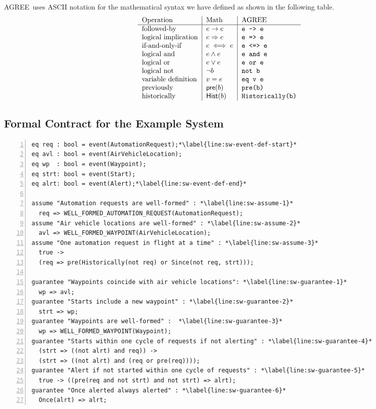\documentclass[global,twocolumn]{svjour}
\newcommand{\konst}[1]{\ensuremath{\mathsf{#1}}}
\newcommand{\imp}{\Rightarrow}
\newcommand{\agr}{AGREE}
\begin{document}
\agr\ uses ASCII notation for the mathematical syntax we have defined as shown in the following table.
%
\[
\begin{tabular}{l|l|l}
 Operation & Math & \agr \\ \hline
 followed-by &  $e \to e$          & \verb+e -> e+  \\
 logical implication &  $e \imp e$ & \verb+e => e+ \\
 if-and-only-if &  $e \iff e$      & \verb+e <=> e+ \\
 logical and &  $e \land e$      & \verb+e and e+ \\
 logical or &  $e \lor e$      & \verb+e or e+ \\
 logical not & $\neg b$      & \verb+not b+ \\
 variable definition & $v = e$     & \verb+eq v e+ \\
 previously  & $\konst{pre}(b)$ & \verb+pre(b)+ \\
 historically  & $\konst{Hist}(b)$ & \verb+Historically(b)+ \\
\end{tabular}
\]


\subsection{Formal Contract for the Example System}
\label{sec:sw-contract}

\newsavebox{\sw}
\begin{lrbox}{\sw}
\begin{lstlisting}[style=agree,numbers=left]
eq req : bool = event(AutomationRequest);*\label{line:sw-event-def-start}*
eq avl : bool = event(AirVehicleLocation);
eq wp  : bool = event(Waypoint);
eq strt: bool = event(Start);
eq alrt: bool = event(Alert);*\label{line:sw-event-def-end}*

assume "Automation requests are well-formed" : *\label{line:sw-assume-1}*
  req => WELL_FORMED_AUTOMATION_REQUEST(AutomationRequest);
assume "Air vehicle locations are well-formed" : *\label{line:sw-assume-2}*
  avl => WELL_FORMED_WAYPOINT(AirVehicleLocation);
assume "One automation request in flight at a time" : *\label{line:sw-assume-3}*
  true ->
  (req => pre(Historically(not req) or Since(not req, strt)));

guarantee "Waypoints coincide with air vehicle locations": *\label{line:sw-guarantee-1}*
  wp => avl;
guarantee "Starts include a new waypoint" : *\label{line:sw-guarantee-2}*
  strt => wp;
guarantee "Waypoints are well-formed" :  *\label{line:sw-guarantee-3}*
  wp => WELL_FORMED_WAYPOINT(Waypoint);
guarantee "Starts within one cycle of requests if not alerting" : *\label{line:sw-guarantee-4}*
  (strt => ((not alrt) and req)) ->
  (strt => ((not alrt) and (req or pre(req))));
guarantee "Alert if not started within one cycle of requests" : *\label{line:sw-guarantee-5}*
  true -> ((pre(req and not strt) and not strt) => alrt);
guarantee "Once alerted always alerted" : *\label{line:sw-guarantee-6}*
  Once(alrt) => alrt;
\end{lstlisting}
\end{lrbox}
\end{document}
